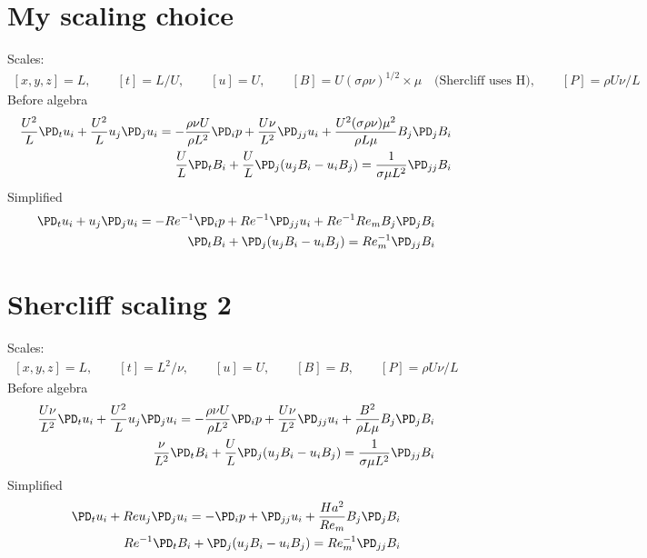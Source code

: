 \documentclass[11pt]{article}
\begin{document}
\section{My scaling choice}
Scales:
\begin{equation}\begin{aligned}
	[x,y,z] = L, \qquad
	[t] = L / U, \qquad
	[u] = U, \qquad
	[B] = U (\sigma \rho \nu)^{1/2} \times \mu \quad \text{(Shercliff uses H)}, \qquad
	[P] = \rho U \nu / L
\end{aligned} \end{equation}
Before algebra
\begin{equation}\begin{aligned}
\frac{U^2}{L} \PD_t u_i+ \frac{U^2}{L} u_j\PD_j u_i =-\frac{\rho \nu U}{\rho L^2}\PD_i p+ \frac{U \nu}{L^2} \PD_{jj} u_i + \frac{U^2 (\sigma \rho \nu) \mu^2}{\rho L \mu} B_j \PD_j B_i \\
\frac{U}{L} \PD_t B_i + \frac{U}{L} \PD_j (u_j B_i - u_i B_j) = \frac{1}{\sigma \mu L^2} \PD_{jj} B_i
\end{aligned} \end{equation}
Simplified
\begin{equation}\begin{aligned}
\PD_t u_i + u_j \PD_j u_i = -Re^{-1}\PD_i p + Re^{-1} \PD_{jj} u_i + Re^{-1} Re_m B_j \PD_j B_i \\
\PD_t B_i + \PD_j (u_j B_i - u_i B_j) = Re_m^{-1} \PD_{jj} B_i
\end{aligned} \end{equation}

\section{Shercliff scaling 2}
Scales:
\begin{equation}\begin{aligned}
	[x,y,z] = L, \qquad
	[t] = L^2 / \nu, \qquad
	[u] = U, \qquad
	[B] = B, \qquad
	[P] = \rho U \nu / L
\end{aligned} \end{equation}
Before algebra
\begin{equation}\begin{aligned}
\frac{U \nu}{L^2} \PD_t u_i+ \frac{U^2}{L} u_j\PD_j u_i =-\frac{\rho \nu U}{\rho L^2}\PD_i p+ \frac{U \nu}{L^2} \PD_{jj} u_i + \frac{B^2}{\rho L \mu} B_j \PD_j B_i \\
\frac{\nu}{L^2} \PD_t B_i + \frac{U}{L} \PD_j (u_j B_i - u_i B_j) = \frac{1}{\sigma \mu L^2} \PD_{jj} B_i
\end{aligned} \end{equation}
Simplified
\begin{equation}\begin{aligned}
\PD_t u_i+ Re u_j\PD_j u_i =-\PD_i p+ \PD_{jj} u_i + \frac{Ha^2}{Re_m} B_j \PD_j B_i \\
Re^{-1} \PD_t B_i + \PD_j (u_j B_i - u_i B_j) = Re_m^{-1} \PD_{jj} B_i
\end{aligned} \end{equation}
\end{document}
